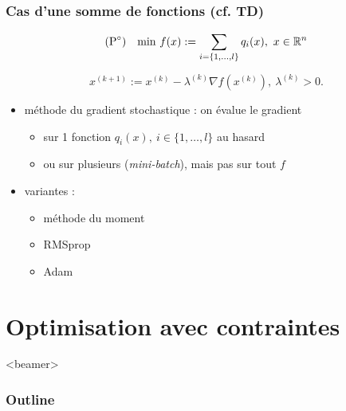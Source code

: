 \documentclass{beamer}
\newcommand{\R}{{\ensuremath\mathbb{R}}}
\begin{document}
\begin{frame}
  \frametitle{Cas d'une somme de fonctions (cf. TD)}

  \[
  (\text{P}^\circ) \quad
    \text{min} \ f(x) := \sum_{i = \{1,\dots,l\}} q_i(x), \ x \in \R^n
  \]

  \[ x^{(k+1)} := x^{(k)} - \lambda^{(k)} {\nabla f}(x^{(k)}), \ \lambda^{(k)} > 0. \]
  
  \begin{itemize}
  \item méthode du gradient stochastique : on évalue le gradient
    \begin{itemize}
    \item sur 1 fonction $q_i(x), \ i \in \{1,\dots,l\}$ au hasard
    \item ou sur plusieurs (\emph{mini-batch}), mais pas sur tout $f$
    \end{itemize}
  \item variantes :
    \begin{itemize}
    \item méthode du moment 
    \item RMSprop
    \item Adam
    \end{itemize}
  \end{itemize}
  
\end{frame}


\section{Optimisation avec contraintes}

\begin{frame}<beamer>
  \frametitle{Outline}
  \tableofcontents[currentsection]
\end{frame}
\end{document}

